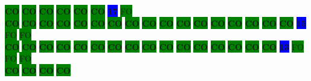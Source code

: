\colorbox{green}{\color[rgb]{0,0,0}\textbf{CO}}%
\colorbox{green}{\color[rgb]{0,0,0}\textbf{CO}}%
\colorbox{green}{\color[rgb]{0,0,0}\textbf{CO}}%
\colorbox{green}{\color[rgb]{0,0,0}\textbf{CO}}%
\colorbox{green}{\color[rgb]{0,0,0}\textbf{CO}}%
\colorbox{green}{\color[rgb]{0,0,0}\textbf{CO}}%
\colorbox{blue}{\color[rgb]{1,0,0}\textbf{17}}%
\colorbox{green}{\color[gray]{0.75}FO}%
\\
\colorbox{green}{\color[rgb]{0,0,0}\textbf{CO}}%
\colorbox{green}{\color[rgb]{0,0,0}\textbf{CO}}%
\colorbox{green}{\color[rgb]{0,0,0}\textbf{CO}}%
\colorbox{green}{\color[rgb]{0,0,0}\textbf{CO}}%
\colorbox{green}{\color[rgb]{0,0,0}\textbf{CO}}%
\colorbox{green}{\color[rgb]{0,0,0}\textbf{CO}}%
\colorbox{green}{\color[rgb]{0,0,0}\textbf{CO}}%
\colorbox{green}{\color[rgb]{0,0,0}\textbf{CO}}%
\colorbox{green}{\color[rgb]{0,0,0}\textbf{CO}}%
\colorbox{green}{\color[rgb]{0,0,0}\textbf{CO}}%
\colorbox{green}{\color[rgb]{0,0,0}\textbf{CO}}%
\colorbox{green}{\color[rgb]{0,0,0}\textbf{CO}}%
\colorbox{green}{\color[rgb]{0,0,0}\textbf{CO}}%
\colorbox{green}{\color[rgb]{0,0,0}\textbf{CO}}%
\colorbox{green}{\color[rgb]{0,0,0}\textbf{CO}}%
\colorbox{green}{\color[rgb]{0,0,0}\textbf{CO}}%
\colorbox{green}{\color[rgb]{0,0,0}\textbf{CO}}%
\colorbox{blue}{\color[rgb]{1,0,0}\textbf{15}}%
\colorbox{green}{\color[gray]{0.75}FO}%
\colorbox{green}{\color[gray]{0.75}FO}%
\\
\colorbox{green}{\color[rgb]{0,0,0}\textbf{CO}}%
\colorbox{green}{\color[rgb]{0,0,0}\textbf{CO}}%
\colorbox{green}{\color[rgb]{0,0,0}\textbf{CO}}%
\colorbox{green}{\color[rgb]{0,0,0}\textbf{CO}}%
\colorbox{green}{\color[rgb]{0,0,0}\textbf{CO}}%
\colorbox{green}{\color[rgb]{0,0,0}\textbf{CO}}%
\colorbox{green}{\color[rgb]{0,0,0}\textbf{CO}}%
\colorbox{green}{\color[rgb]{0,0,0}\textbf{CO}}%
\colorbox{green}{\color[rgb]{0,0,0}\textbf{CO}}%
\colorbox{green}{\color[rgb]{0,0,0}\textbf{CO}}%
\colorbox{green}{\color[rgb]{0,0,0}\textbf{CO}}%
\colorbox{green}{\color[rgb]{0,0,0}\textbf{CO}}%
\colorbox{green}{\color[rgb]{0,0,0}\textbf{CO}}%
\colorbox{green}{\color[rgb]{0,0,0}\textbf{CO}}%
\colorbox{green}{\color[rgb]{0,0,0}\textbf{CO}}%
\colorbox{green}{\color[rgb]{0,0,0}\textbf{CO}}%
\colorbox{blue}{\color[rgb]{1,0,0}\textbf{13}}%
\colorbox{green}{\color[gray]{0.75}FO}%
\colorbox{green}{\color[gray]{0.75}FO}%
\colorbox{green}{\color[gray]{0.75}FO}%
\\
\colorbox{green}{\color[rgb]{0,0,0}\textbf{CO}}%
\colorbox{green}{\color[rgb]{0,0,0}\textbf{CO}}%
\colorbox{green}{\color[rgb]{0,0,0}\textbf{CO}}%
\colorbox{green}{\color[rgb]{0,0,0}\textbf{CO}}%
